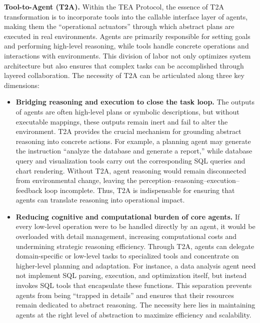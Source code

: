 \documentclass[11pt]{article}
\begin{document}
\textbf{Tool-to-Agent (T2A).} Within the TEA Protocol, the essence of T2A transformation is to incorporate tools into the callable interface layer of agents, making them the ``operational actuators'' through which abstract plans are executed in real environments. Agents are primarily responsible for setting goals and performing high-level reasoning, while tools handle concrete operations and interactions with environments. This division of labor not only optimizes system architecture but also ensures that complex tasks can be accomplished through layered collaboration. The necessity of T2A can be articulated along three key dimensions:  

\begin{itemize}[leftmargin=*, itemsep=0.4em]  

  \item \textbf{Bridging reasoning and execution to close the task loop.}  
  The outputs of agents are often high-level plans or symbolic descriptions, but without executable mappings, these outputs remain inert and fail to alter the environment. T2A provides the crucial mechanism for grounding abstract reasoning into concrete actions. For example, a planning agent may generate the instruction ``analyze the database and generate a report,'' while database query and visualization tools carry out the corresponding SQL queries and chart rendering. Without T2A, agent reasoning would remain disconnected from environmental change, leaving the perception–reasoning–execution–feedback loop incomplete. Thus, T2A is indispensable for ensuring that agents can translate reasoning into operational impact.  

  \item \textbf{Reducing cognitive and computational burden of core agents.}  
  If every low-level operation were to be handled directly by an agent, it would be overloaded with detail management, increasing computational costs and undermining strategic reasoning efficiency. Through T2A, agents can delegate domain-specific or low-level tasks to specialized tools and concentrate on higher-level planning and adaptation. For instance, a data analysis agent need not implement SQL parsing, execution, and optimization itself, but instead invokes SQL tools that encapsulate these functions. This separation prevents agents from being ``trapped in details'' and ensures that their resources remain dedicated to abstract reasoning. The necessity here lies in maintaining agents at the right level of abstraction to maximize efficiency and scalability.  


\end{itemize}
\end{document}
